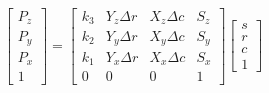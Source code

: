 \documentclass{article}
\begin{document}
\begin{equation}
    \begin{bmatrix}P_z \\ P_y \\ P_x \\ 1\end{bmatrix}
    =
    \begin{bmatrix}
        k_3 & Y_z \Delta r & X_z \Delta c & S_z \\
        k_2 & Y_y \Delta r & X_y \Delta c & S_y \\
        k_1 & Y_x \Delta r & X_x \Delta c & S_x \\
          0 &      0 &      0 &  1
    \end{bmatrix}
    \begin{bmatrix}s \\ r \\ c \\ 1\end{bmatrix}
\end{equation}
\end{document}
